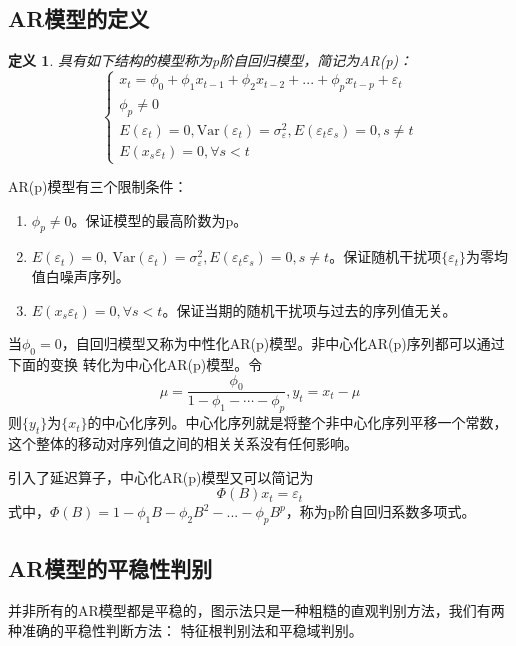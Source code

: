 \documentclass[12pt, a4paper, oneside]{ctexbook}
\newtheorem{definition}[theorem]{定义}
\begin{document}
\subsection{AR模型的定义}
\begin{definition}
    具有如下结构的模型称为p阶自回归模型，简记为AR(p)：
    \begin{equation}\label{eq3.4}
        \begin{cases}
            x_t=\phi_0+\phi_1x_{t-1}+\phi_2x_{t-2}+...+\phi_{p}x_{t-p}+\varepsilon_{t} \\
            \phi_p\neq0                                                                \\
            E(\varepsilon_{t})=0,\mathrm{Var}(\varepsilon_{t})=
            \sigma_{\varepsilon}^2,E(\varepsilon_t\varepsilon_{s})=0,s\neq t           \\
            E(x_s\varepsilon_{t})=0,\forall s<t
        \end{cases}
    \end{equation}
\end{definition}
AR(p)模型有三个限制条件：
\begin{enumerate}[1、]
    \item $\phi_p \neq 0$。保证模型的最高阶数为p。
    \item $E(\varepsilon_{t})=0,\mathrm{~Var}(\varepsilon_{t})=\sigma_{\varepsilon}^2,
              E(\varepsilon_t\varepsilon_{s})=0,s\neq t$。保证随机干扰项$\{\varepsilon_t\}$为零均值白噪声序列。
    \item $E(x_s\varepsilon_{t})=0,\forall s < t$。保证当期的随机干扰项与过去的序列值无关。
\end{enumerate}

当$\phi_0 = 0$，自回归模型又称为中性化AR(p)模型。非中心化AR(p)序列都可以通过下面的变换
转化为中心化AR(p)模型。令
\begin{equation}
    \mu=\frac{\phi_{0}}{1-\phi_{1}-\cdots-\phi_{p}},y_{t}=x_{t}-\mu
\end{equation}
则$\{y_t\}$为$\{x_t\}$的中心化序列。中心化序列就是将整个非中心化序列平移一个常数，
这个整体的移动对序列值之间的相关关系没有任何影响。

引入了延迟算子，中心化AR(p)模型又可以简记为
\begin{equation}
    \Phi(B)x_t = \varepsilon_t
\end{equation}
式中，$\Phi(B)=1-\phi_1B-\phi_2B^2-...-\phi_pB^p$，称为p阶自回归系数多项式。

\subsection{AR模型的平稳性判别}
并非所有的AR模型都是平稳的，图示法只是一种粗糙的直观判别方法，我们有两种准确的平稳性判断方法：
特征根判别法和平稳域判别。
\end{document}
